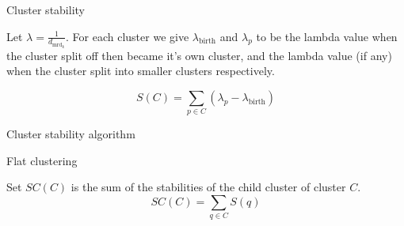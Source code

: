 \documentclass{beamer}
\begin{document}
\begin{frame}{Cluster stability}
\begin{definition}
	Let $\lambda = \frac{1}{d_{\mathrm{mrd}_k}}$. For each cluster we give $\lambda_{\mathrm{birth}}$ and $\lambda_p$ to be the lambda value when the cluster split off then became it’s own cluster, and the lambda value (if any) when the cluster split into smaller clusters respectively.
\end{definition}
$$ S(C) = \sum_{p \in {C}} (\lambda_p - \lambda_{\mathrm{birth}})$$
\end{frame}

\begin{frame}{Cluster stability algorithm}
\begin{algorithm}[H]
	\SetAlgoNoLine
\end{algorithm}
\end{frame}

\begin{frame}{Flat clustering}
\begin{definition}
	Set $SC(C)$ is the sum of the stabilities of the child cluster of cluster $C$.
	$$SC(C) = \sum_{q \in C}S(q)$$
\end{definition}
\end{frame}
\end{document}
